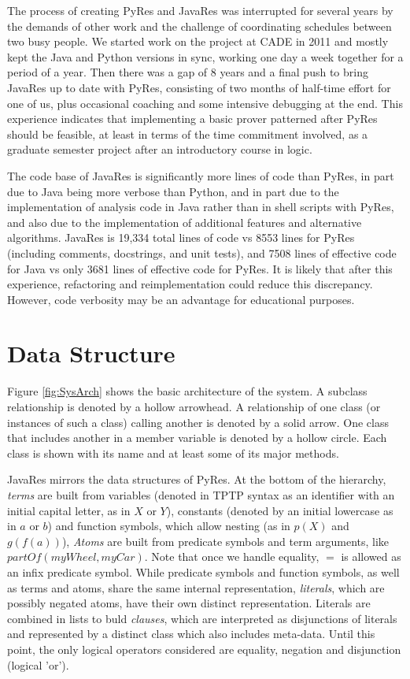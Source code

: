 \documentclass{llncs}
\begin{document}
The process of creating PyRes and JavaRes was interrupted for several
years by the demands of other work and the challenge of coordinating
schedules between two busy people.  We started work on the project at
CADE in 2011 and mostly kept the Java and Python versions in sync,
working one day a week together for a period of a year.  Then there was a gap of 8 years and
a final push to bring JavaRes up to date with PyRes, consisting of two
months of half-time effort for one of us, plus occasional coaching and
some intensive debugging at the end.  This experience indicates that
implementing a basic prover patterned after PyRes should be feasible,
at least in terms of the time commitment involved, as a
graduate semester project after an introductory course in logic.

The code base of JavaRes is significantly more lines of code than
PyRes, in part due to Java being more verbose than Python, and in part
due to the implementation of analysis code in Java rather than in shell
scripts with PyRes, and also due to the implementation of additional
features and alternative algorithms.  JavaRes is 19,334 total lines of code vs 8553 lines
for PyRes (including comments, docstrings, and unit tests), and 7508 lines of effective
code for Java vs only 3681 lines of effective code for PyRes.  It is likely
that after this experience, refactoring and reimplementation could reduce
this discrepancy. However, code verbosity may be an advantage for educational purposes.

\section{Data Structure}

Figure \ref{fig:SysArch} shows the basic architecture of the system. A
subclass relationship is denoted by a hollow arrowhead.  A relationship
of one class (or instances of such a class) calling another is denoted
by a solid arrow.  One class that includes another in a member
variable is denoted by a hollow circle.  Each class is shown with its
name and at least some of its major methods.

JavaRes mirrors the data structures of PyRes.  At the bottom of the
hierarchy, \emph{terms} are built from variables (denoted in TPTP
syntax as an identifier with an initial capital letter, as in $X$ or
$Y$), constants (denoted by an initial lowercase as in $a$ or $b$) and
function symbols, which allow nesting (as in $p(X)$ and $g(f(a))$),
\emph{Atoms} are built from predicate symbols and term arguments, like
$partOf(myWheel,myCar)$.  Note that once we handle equality, $=$ is
allowed as an infix predicate symbol. While predicate symbols and
function symbols, as well as terms and atoms, share the same internal
representation, \emph{literals}, which are possibly negated atoms,
have their own distinct representation. Literals are combined in lists
to buld \emph{clauses}, which are interpreted as disjunctions of
literals and represented by a distinct class which also includes
meta-data.  Until this point, the only logical operators considered
are equality, negation and disjunction (logical 'or').
\end{document}
